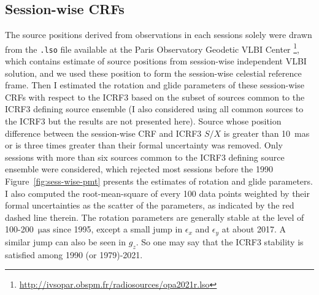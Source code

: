 \documentclass{aa}
\begin{document}
\begin{appendix}
\section{Session-wise CRFs} %

The source positions derived from observations in each sessions solely were
drawn from the \texttt{.lso} file available at the Paris Observatory Geodetic VLBI Center 
\footnote{\url{http://ivsopar.obspm.fr/radiosources/opa2021r.lso}}, which contains estimate of 
source positions from session-wise independent VLBI solution, and we used 
these position to form the session-wise celestial reference frame.
Then I estimated the rotation and glide parameters of these session-wise CRFs with respect to 
the ICRF3 based on the subset of sources common to the ICRF3 defining source ensemble
(I also considered using all common sources to the ICRF3 but the results are not presented here).
Source whose position difference between the session-wise CRF and ICRF3 $S/X$ is greater than 10~mas 
or is three times greater than their formal uncertainty was removed.
Only sessions with more than six sources common to the ICRF3 defining source ensemble were considered, 
which rejected most sessions before the 1990
Figure~\ref{fig:sess-wise-pmt} presents the estimates of rotation and glide parameters.
I also computed the root-mean-square of every 100 data points weighted by their formal uncertainties 
as the scatter of the parameters, as indicated by the red dashed line therein.
The rotation parameters are generally stable at the level of 100-200~$\mathrm{\mu as}$ since 1995, except a small jump in $\epsilon_x$ and $\epsilon_y$ at about 2017.
A similar jump can also be seen in $g_z$.
So one may say that the ICRF3 stability is satisfied among 1990 (or 1979)-2021.



\end{appendix}
\end{document}
